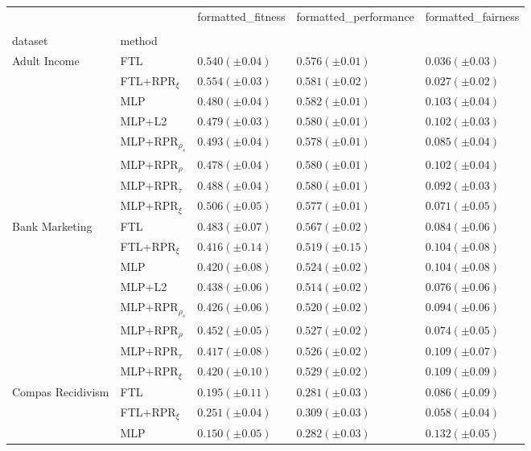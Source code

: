 \begin{tabular}{lllll}
\toprule
 &  & formatted_fitness & formatted_performance & formatted_fairness \\
 &  &  &  &  \\
dataset & method &  &  &  \\
\midrule
\multirow[t]{8}{*}{Adult Income} & FTL & $0.540 (\pm0.04)$ & $0.576 (\pm0.01)$ & $0.036 (\pm0.03)$ \\
 & FTL+RPR$_{\xi}$ & $0.554 (\pm0.03)$ & $0.581 (\pm0.02)$ & $0.027 (\pm0.02)$ \\
 & MLP & $0.480 (\pm0.04)$ & $0.582 (\pm0.01)$ & $0.103 (\pm0.04)$ \\
 & MLP+L2 & $0.479 (\pm0.03)$ & $0.580 (\pm0.01)$ & $0.102 (\pm0.03)$ \\
 & MLP+RPR$_{\rho_s}$ & $0.493 (\pm0.04)$ & $0.578 (\pm0.01)$ & $0.085 (\pm0.04)$ \\
 & MLP+RPR$_{\rho}$ & $0.478 (\pm0.04)$ & $0.580 (\pm0.01)$ & $0.102 (\pm0.04)$ \\
 & MLP+RPR$_{\tau}$ & $0.488 (\pm0.04)$ & $0.580 (\pm0.01)$ & $0.092 (\pm0.03)$ \\
 & MLP+RPR$_{\xi}$ & $0.506 (\pm0.05)$ & $0.577 (\pm0.01)$ & $0.071 (\pm0.05)$ \\
\cline{1-5}
\multirow[t]{8}{*}{Bank Marketing} & FTL & $0.483 (\pm0.07)$ & $0.567 (\pm0.02)$ & $0.084 (\pm0.06)$ \\
 & FTL+RPR$_{\xi}$ & $0.416 (\pm0.14)$ & $0.519 (\pm0.15)$ & $0.104 (\pm0.08)$ \\
 & MLP & $0.420 (\pm0.08)$ & $0.524 (\pm0.02)$ & $0.104 (\pm0.08)$ \\
 & MLP+L2 & $0.438 (\pm0.06)$ & $0.514 (\pm0.02)$ & $0.076 (\pm0.06)$ \\
 & MLP+RPR$_{\rho_s}$ & $0.426 (\pm0.06)$ & $0.520 (\pm0.02)$ & $0.094 (\pm0.06)$ \\
 & MLP+RPR$_{\rho}$ & $0.452 (\pm0.05)$ & $0.527 (\pm0.02)$ & $0.074 (\pm0.05)$ \\
 & MLP+RPR$_{\tau}$ & $0.417 (\pm0.08)$ & $0.526 (\pm0.02)$ & $0.109 (\pm0.07)$ \\
 & MLP+RPR$_{\xi}$ & $0.420 (\pm0.10)$ & $0.529 (\pm0.02)$ & $0.109 (\pm0.09)$ \\
\cline{1-5}
\multirow[t]{8}{*}{Compas Recidivism} & FTL & $0.195 (\pm0.11)$ & $0.281 (\pm0.03)$ & $0.086 (\pm0.09)$ \\
 & FTL+RPR$_{\xi}$ & $0.251 (\pm0.04)$ & $0.309 (\pm0.03)$ & $0.058 (\pm0.04)$ \\
 & MLP & $0.150 (\pm0.05)$ & $0.282 (\pm0.03)$ & $0.132 (\pm0.05)$ \\

\end{tabular}
